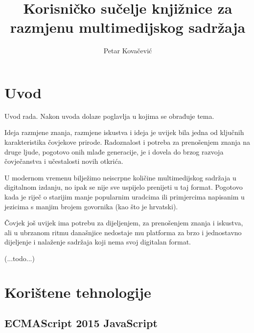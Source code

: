 \documentclass[times, utf8, zavrsni, numeric]{fer}
\begin{document}

\title{Korisničko sučelje knjižnice za razmjenu multimedijskog sadržaja}

\author{Petar Kovačević}

\maketitle

\izvornik

\zahvala{}


\tableofcontents


\chapter{Uvod}
Uvod rada. Nakon uvoda dolaze poglavlja u kojima se obrađuje tema.

Ideja razmjene znanja, razmjene iskustva i ideja je uvijek bila jedna od ključnih karakteristika čovjekove prirode.
Radoznalost i potreba za prenošenjem znanja na druge ljude, pogotovo onih mlađe generacije, je i dovela do brzog razvoja čovječanstva i učestalosti novih otkrića.

U modernom vremenu bilježimo neiscrpne količine multimedijskog sadržaja u digitalnom izdanju, no ipak se nije sve uspijelo prenijeti u taj format.
Pogotovo kada je riječ o starijim manje popularnim uradcima ili primjercima napisanim u jezicima s manjim brojem govornika (kao što je hrvatski).

Čovjek još uvijek ima potrebu za dijeljenjem, za prenošenjem znanja i iskustva, ali u ubrzanom ritmu današnjice nedostaje mu platforma za brzo i jednostavno dijeljenje i nalaženje sadržaja koji nema svoj digitalan format. 

(...todo...)


\chapter{Korištene tehnologije}



\section{ECMAScript 2015 JavaScript}
\end{document}
